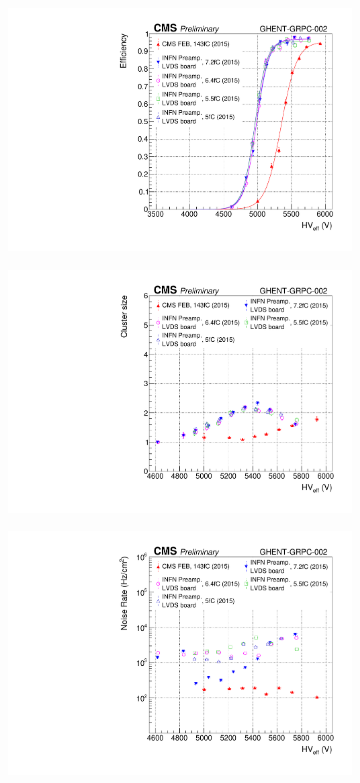     \begin{figure}[H]
		\begin{subfigure}{.5\linewidth}
		    \centering
			\includegraphics[width=\linewidth]{fig/chapt6/gRPC-INFN-LVDS-Eff-Shift.pdf}
			\caption{\label{fig:INFN-gRPC:A}}
		\end{subfigure}
		\begin{subfigure}{.5\linewidth}
		    \centering
			\includegraphics[width = \linewidth]{fig/chapt6/gRPC-INFN-LVDS-ClS-Shift.pdf}
			\caption{\label{fig:INFN-gRPC:B}}
		\end{subfigure}
		\begin{subfigure}{\linewidth}
		    \centering
			\includegraphics[width = .5\linewidth]{fig/chapt6/gRPC-INFN-LVDS-Rate-Shift.pdf}

\end{subfigure}
\end{figure}
